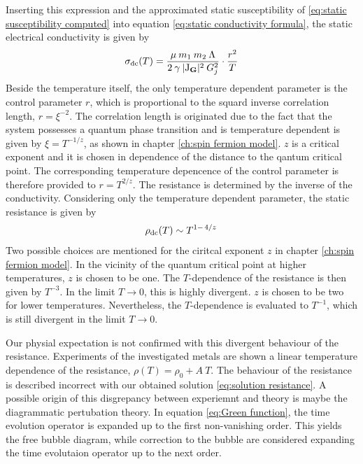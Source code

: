 %
Inserting this expression and the approximated static susceptibility of \eqref{eq:static susceptibility computed} into equation \eqref{eq:static conductivity formula}, the static electrical conductivity is given by
%
\begin{align}
	\sigma_{\mathrm{dc}}(T) = \frac{\mu\: m_{1}\: m_{2}\: \Lambda}{2\: \gamma\: \vert \mathrm{J}_{\vb{G}} \vert^{2}\: G_{j}^{2}} \cdot \frac{r^{2}}{T}
\end{align}
%
Beside the temperature itself, the only temperature dependent parameter is the control parameter $r$, which is proportional to the squard inverse correlation length, $r = \xi^{-2}$.
The correlation length is originated due to the fact that the system possesses a quantum phase transition and is temperature dependent is given by $\xi = T^{-1/z}$, as shown in chapter \ref{ch:spin fermion model}.
$z$ is a critical exponent and it is chosen in dependence of the distance to the qantum critical point.
The corresponding temperature depencence of the control parameter is therefore provided to $r = T^{2/z}$.
The resistance is determined by the inverse of the conductivity.
Considering only the temperature dependent parameter, the static resistance is given by
%
\begin{align}
	\rho_{\mt{dc}}(T) \sim T^{1-\flatfrac{4}{z}}
	\label{eq:solution resistance}
\end{align}
%
Two possible choices are mentioned for the ciritcal exponent $z$ in chapter \ref{ch:spin fermion model}.
In the vicinity of the quantum critical point at higher temperatures, $z$ is chosen to be one.
The $T$-dependence of the resistance is then given by $T^{-3}$.
In the limit $T \to 0$, this is highly divergent.
$z$ is chosen to be two for lower temperatures.
Nevertheless, the $T$-dependence is evaluated to $T^{-1}$, which is still divergent in the limit $T \to 0$.

Our physial expectation is not confirmed with this divergent behaviour of the resistance.
Experiments of the investigated metals \cite{Loehneysen} are shown a linear temperature dependence of the resistance, $\rho(T) = \rho_{0} + A\: T$.
The behaviour of the resistance is described incorrect with our obtained solution \eqref{eq:solution resistance}.
A possible origin of this disgrepancy between experiemnt and theory is maybe the diagrammatic pertubation theory.
In equation \eqref{eq:Green function}, the time evolution operator is expanded up to the first non-vanishing order.
This yields the free bubble diagram, while correction to the bubble are considered  expanding the time evolutaion operator up to the next order.







